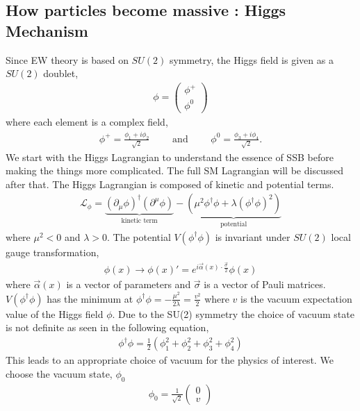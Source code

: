 \subsection{How particles become massive : Higgs Mechanism}
Since EW theory is based on $SU(2)$ symmetry, the Higgs field is 
given as a $SU(2)$ doublet, 
\begin{eqnarray} 
\phi = \left(  \begin{array}{c} \phi^+ \\ \phi^0 \end{array} \right)
\end{eqnarray} 
where each element is a complex field, 
\begin{eqnarray} 
\phi^+ = \frac{\phi_1 + i\phi_2}{\sqrt{2}} 
\qquad \textrm{ and } \qquad  
\phi^0 = \frac{\phi_3 + i\phi_4}{\sqrt{2}}.
\end{eqnarray} 
We start with the Higgs Lagrangian to understand the essence of SSB 
before making the things more complicated. The full SM Lagrangian will be discussed after that.  
The Higgs Lagrangian is composed of kinetic and potential terms. 
\begin{eqnarray} 
\mathcal{L}_\phi 
=
\underbrace{
    \left( \partial_\mu \phi \right)^\dagger \left( \partial^\mu \phi \right)
}_\text{kinetic term} 
- 
\underbrace{
    \left( \mu^2 \phi^\dagger \phi + \lambda \left( \phi^\dagger \phi \right)^2 \right)
}_\text{potential} 
\end{eqnarray} 
where $\mu^2<0$ and $\lambda>0$.
The potential $V\left( \phi^\dagger \phi \right)$ is invariant under 
$SU(2)$ local gauge transformation, 
\begin{eqnarray} 
\phi(x) 
\rightarrow 
\phi(x)' = e^{i \vec{\alpha}(x) \cdot \frac{\vec{\sigma}}{2}} \phi(x)
\end{eqnarray} 
where $\vec{\alpha}(x)$ is a vector of parameters and  
$\vec{\sigma}$ is a vector of Pauli matrices. 
$V\left( \phi^\dagger \phi \right)$ has the minimum at 
$\displaystyle  \phi^\dagger \phi = -\frac{\mu^2}{2\lambda} = \frac{v^2}{2}$ where 
$v$ is the vacuum expectation value of the Higgs field $\phi$.
Due to the SU(2) symmetry the choice of vacuum state is not definite 
as seen in the following equation, 
\begin{eqnarray} 
\phi^\dagger \phi = \frac{1}{2} \left( \phi_1^2 + \phi_2^2 + \phi_3^2 + \phi_4^2\right) 
\end{eqnarray} 
This leads to an appropriate choice of vacuum for the physics of interest. 
We choose the vacuum state, $\phi_0$
\begin{eqnarray} 
\phi_0 = \frac{1}{\sqrt{2}} \left(  \begin{array}{c} 0 \\ v \end{array} \right)
\end{eqnarray} 
